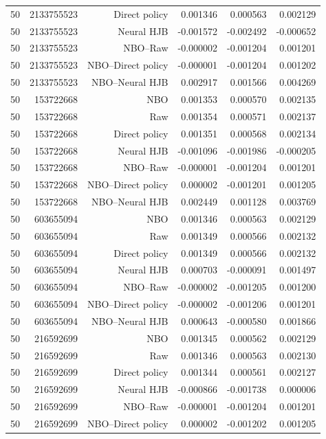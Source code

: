 \begin{longtable}{lrrrrr}
50 & 2133755523 & Direct policy & 0.001346 & 0.000563 & 0.002129 \\
50 & 2133755523 & Neural HJB & -0.001572 & -0.002492 & -0.000652 \\
50 & 2133755523 & NBO--Raw & -0.000002 & -0.001204 & 0.001201 \\
50 & 2133755523 & NBO--Direct policy & -0.000001 & -0.001204 & 0.001202 \\
50 & 2133755523 & NBO--Neural HJB & 0.002917 & 0.001566 & 0.004269 \\
50 & 153722668 & NBO & 0.001353 & 0.000570 & 0.002135 \\
50 & 153722668 & Raw & 0.001354 & 0.000571 & 0.002137 \\
50 & 153722668 & Direct policy & 0.001351 & 0.000568 & 0.002134 \\
50 & 153722668 & Neural HJB & -0.001096 & -0.001986 & -0.000205 \\
50 & 153722668 & NBO--Raw & -0.000001 & -0.001204 & 0.001201 \\
50 & 153722668 & NBO--Direct policy & 0.000002 & -0.001201 & 0.001205 \\
50 & 153722668 & NBO--Neural HJB & 0.002449 & 0.001128 & 0.003769 \\
50 & 603655094 & NBO & 0.001346 & 0.000563 & 0.002129 \\
50 & 603655094 & Raw & 0.001349 & 0.000566 & 0.002132 \\
50 & 603655094 & Direct policy & 0.001349 & 0.000566 & 0.002132 \\
50 & 603655094 & Neural HJB & 0.000703 & -0.000091 & 0.001497 \\
50 & 603655094 & NBO--Raw & -0.000002 & -0.001205 & 0.001200 \\
50 & 603655094 & NBO--Direct policy & -0.000002 & -0.001206 & 0.001201 \\
50 & 603655094 & NBO--Neural HJB & 0.000643 & -0.000580 & 0.001866 \\
50 & 216592699 & NBO & 0.001345 & 0.000562 & 0.002129 \\
50 & 216592699 & Raw & 0.001346 & 0.000563 & 0.002130 \\
50 & 216592699 & Direct policy & 0.001344 & 0.000561 & 0.002127 \\
50 & 216592699 & Neural HJB & -0.000866 & -0.001738 & 0.000006 \\
50 & 216592699 & NBO--Raw & -0.000001 & -0.001204 & 0.001201 \\
50 & 216592699 & NBO--Direct policy & 0.000002 & -0.001202 & 0.001205 \\

\end{longtable}
